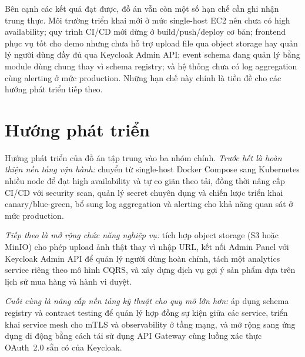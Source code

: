 \documentclass[../DoAn.tex]{subfiles}
\begin{document}
Bên cạnh các kết quả đạt được, đồ án vẫn còn một số hạn chế cần ghi nhận trung thực. Môi trường
triển khai mới ở mức single-host EC2 nên chưa có high availability; quy trình CI/CD mới dừng ở
build/push/deploy cơ bản; frontend phục vụ tốt cho demo nhưng chưa hỗ trợ upload file qua object
storage hay quản lý người dùng đầy đủ qua Keycloak Admin API; event schema đang quản lý bằng
module dùng chung thay vì schema registry; và hệ thống chưa có log aggregation cùng alerting ở
mức production. Những hạn chế này chính là tiền đề cho các hướng phát triển tiếp theo.

\section*{Hướng phát triển}

Hướng phát triển của đồ án tập trung vào ba nhóm chính. \textit{Trước hết là hoàn thiện nền tảng
vận hành:} chuyển từ single-host Docker Compose sang Kubernetes nhiều node để đạt high
availability và tự co giãn theo tải, đồng thời nâng cấp CI/CD với security scan, quản lý secret
chuyên dụng và chiến lược triển khai canary/blue-green, bổ sung log aggregation và alerting cho
khả năng quan sát ở mức production.

\textit{Tiếp theo là mở rộng chức năng nghiệp vụ:} tích hợp object storage (S3 hoặc MinIO) cho
phép upload ảnh thật thay vì nhập URL, kết nối Admin Panel với Keycloak Admin API để quản lý
người dùng hoàn chỉnh, tách một analytics service riêng theo mô hình CQRS, và xây dựng dịch vụ
gợi ý sản phẩm dựa trên lịch sử mua hàng và hành vi duyệt.

\textit{Cuối cùng là nâng cấp nền tảng kỹ thuật cho quy mô lớn hơn:} áp dụng schema registry và
contract testing để quản lý hợp đồng sự kiện giữa các service, triển khai service mesh cho mTLS
và observability ở tầng mạng, và mở rộng sang ứng dụng di động bằng cách tái sử dụng API Gateway
cùng luồng xác thực OAuth~2.0 sẵn có của Keycloak.
\end{document}
